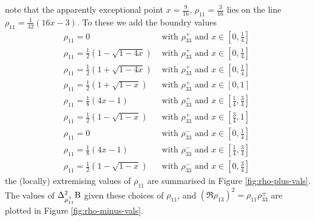 note that the apparently exceptional point $x = \frac{9}{16}$, $\rho_{11} = \frac{3}{16}$ lies on the line $\rho_{11} = \frac{1}{32} \left(16 x-3 \right)$. To these we add the boundry values
\begin{subequations}
\label{eqn:rho11-con}
\begin{align}
  \label{eqn:rho-plus-con-1}\rho_{11} = 0 &\text{ with } \rho_{33}^+ \text{ and } x\in\left[0,\frac{1}{4}\right]\\
  \label{eqn:rho-plus-con-2}\rho_{11} = \frac{1}{2}\left(1-\sqrt{1-4x}\right) &\text{ with } \rho_{33}^+ \text{ and } x\in\left[0,\frac{1}{4}\right]\\
  \label{eqn:rho-plus-con-3}\rho_{11} = \frac{1}{2}\left(1+\sqrt{1-4x}\right) &\text{ with } \rho_{33}^+ \text{ and } x\in\left[0,\frac{1}{4}\right]\\
  \label{eqn:rho-plus-con-4}\rho_{11} = \frac{1}{2}\left(1+\sqrt{1-x}\right) &\text{ with } \rho_{33}^+ \text{ and } x\in\left[0,1\right]\\
  \label{eqn:rho-plus-con-5}\rho_{11} = \frac{1}{8}\left(4x-1\right) &\text{ with } \rho_{33}^+ \text{ and } x\in\left[\frac{1}{4},\frac{3}{4}\right]\\  
  \label{eqn:rho-plus-con-6}\rho_{11} = \frac{1}{2}\left(1-\sqrt{1-x}\right) &\text{ with } \rho_{33}^+ \text{ and } x\in\left[\frac{3}{4},1\right]\\
  \label{eqn:rho-minus-con-1}\rho_{11} = 0  &\text{ with } \rho_{33}^- \text{ and } x\in\left[0,\frac{1}{4}\right]\\
  \label{eqn:rho-minus-con-2}\rho_{11} = \frac{1}{8}(4x-1)  &\text{ with } \rho_{33}^- \text{ and } x\in\left[\frac{1}{4},\frac{3}{4}\right]\\
  \label{eqn:rho-minus-con-3}\rho_{11}= \frac{1}{2}(1-\sqrt{1-x}) &\text{ with } \rho_{33}^- \text{ and } x\in\left[0,\frac{3}{4}\right]\
\end{align}
\end{subequations}
the (locally) extremising values of $\rho_{11}$ are summarised in Figure \ref{fig:rho-plus-vals}. The values of $\var[\rho_{11}^+]{\opb}$ given these choices of $\rho_{11}$, and $\left(\Re{\rho_{13}}\right)^2 = \rho_{11}\rho_{33}^\pm$ are plotted in Figure \ref{fig:rho-minus-vals}.
